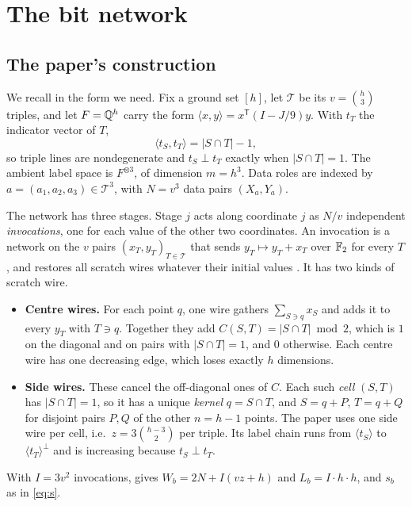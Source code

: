 \section{The bit network}\label{sec:bit}

\subsection{The paper's construction}\label{sec:paperbit}

We recall \cite[\S3]{OAI} in the form we need. Fix a ground set $[h]$, let $\mathcal T$ be its $v = \binom h3$ triples, and let $F = \mathbb{Q}^h$ carry the form $\langle x,y\rangle = x^{\mathsf T}(I-J/9)y$. With $t_T$ the indicator vector of $T$,
\[
\langle t_S, t_T\rangle = |S\cap T| - 1 ,
\]
so triple lines are nondegenerate and $t_S \perp t_T$ exactly when $|S\cap T| = 1$. The ambient label space is $F^{\otimes 3}$, of dimension $m = h^3$. Data roles are indexed by $a = (a_1,a_2,a_3)\in\mathcal T^3$, with $N = v^3$ data pairs $(X_a, Y_a)$.

The network has three stages. Stage $j$ acts along coordinate $j$ as $N/v$ independent \emph{invocations}, one for each value of the other two coordinates. An invocation is a network on the $v$ pairs $(x_T, y_T)_{T\in\mathcal T}$ that sends $y_T \mapsto y_T + x_T$ over $\mathbb{F}_2$ for every $T$, and restores all scratch wires whatever their initial values \cite[Lemma~5]{OAI}. It has two kinds of scratch wire.
\begin{itemize}[leftmargin=*]
\item \textbf{Centre wires.} For each point $q$, one wire gathers $\sum_{S\ni q}x_S$ and adds it to every $y_T$ with $T\ni q$. Together they add $C(S,T) = |S\cap T| \bmod 2$, which is $1$ on the diagonal and on pairs with $|S\cap T| = 1$, and $0$ otherwise. Each centre wire has one decreasing edge, which loses exactly $h$ dimensions.
\item \textbf{Side wires.} These cancel the off-diagonal ones of $C$. Each such \emph{cell} $(S,T)$ has $|S\cap T| = 1$, so it has a unique \emph{kernel} $q = S\cap T$, and $S = q+P$, $T = q+Q$ for disjoint pairs $P, Q$ of the other $n = h-1$ points. The paper uses one side wire per cell, i.e.\ $z = 3\binom{h-3}{2}$ per triple. Its label chain runs from $\langle t_S\rangle$ to $\langle t_T\rangle^\perp$ and is increasing because $t_S\perp t_T$.
\end{itemize}
With $I = 3v^2$ invocations, \cite[Prop.~7]{OAI} gives $W_b = 2N + I(vz + h)$ and $L_b = I\cdot h\cdot h$, and $s_b$ as in \eqref{eq:s}.

